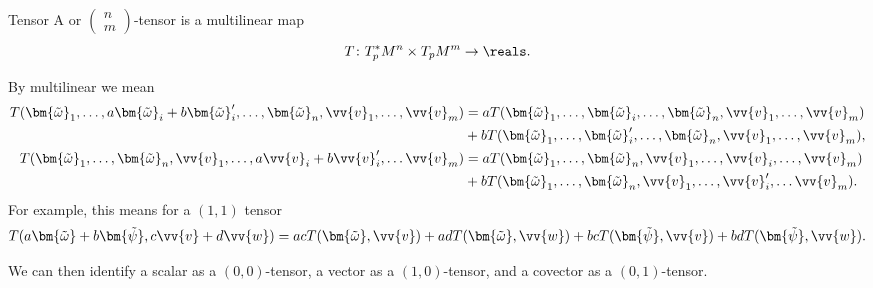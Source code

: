 \documentclass[fleqn]{NotesClass}
\newcommand*{\cv}[1]{\bm{\tilde{#1}}}
\begin{document}
    \begin{dfn}{Tensor}{}
        A  or \(\left( \begin{smallmatrix} n \\ m \end{smallmatrix} \right)\)-tensor is a multilinear map
        \begin{equation}
            T \colon T_p^*M^n \times T_pM^m \to \reals.
        \end{equation}
    \end{dfn}
    By multilinear we mean
    \begin{align*}
        T(\cv{\omega}_1, \dotsc, a\cv{\omega}_i + b\cv{\omega}_i' ,\dotsc, \cv{\omega}_n, \vv{v}_1, \dotsc, \vv{v}_m) &= aT(\cv{\omega}_1, \dotsc, \cv{\omega}_i, \dotsc, \cv{\omega}_n, \vv{v}_1, \dotsc, \vv{v}_m)\\
        &+ bT(\cv{\omega}_1, \dotsc, \cv{\omega}_i', \dotsc, \cv{\omega}_n, \vv{v}_1, \dotsc, \vv{v}_m),\\
        T(\cv{\omega}_1, \dotsc, \cv{\omega}_n, \vv{v}_1, \dotsc, a\vv{v}_i + b\vv{v}_i', \dotsc \vv{v}_m) &= aT(\cv{\omega}_1, \dotsc, \cv{\omega}_n, \vv{v}_1, \dotsc, \vv{v}_i, \dotsc, \vv{v}_m)\\
        &+ bT(\cv{\omega}_1, \dotsc, \cv{\omega}_n, \vv{v}_1, \dotsc, \vv{v}_i', \dotsc \vv{v}_m).
    \end{align*}
    For example, this means for a \((1, 1)\) tensor
    \begin{equation}
        T(a\cv{\omega} + b\cv{\psi}, c\vv{v} + d\vv{w}) = acT(\cv{\omega}, \vv{v}) + adT(\cv{\omega}, \vv{w}) + bcT(\cv{\psi}, \vv{v}) + bdT(\cv{\psi}, \vv{w}).
    \end{equation}
    
    We can then identify a scalar as a \((0, 0)\)-tensor, a vector as a \((1, 0)\)-tensor, and a covector as a \((0, 1)\)-tensor.
    
\end{document}
